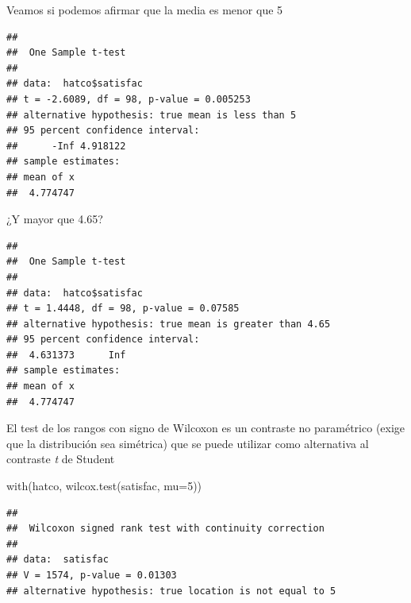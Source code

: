 \documentclass[
]{book}
\newenvironment{Shaded}{\begin{snugshade}}{\end{snugshade}}
\newcommand{\AttributeTok}[1]{\textcolor[rgb]{0.77,0.63,0.00}{#1}}
\newcommand{\DecValTok}[1]{\textcolor[rgb]{0.00,0.00,0.81}{#1}}
\newcommand{\FloatTok}[1]{\textcolor[rgb]{0.00,0.00,0.81}{#1}}
\newcommand{\FunctionTok}[1]{\textcolor[rgb]{0.00,0.00,0.00}{#1}}
\newcommand{\NormalTok}[1]{#1}
\newcommand{\SpecialCharTok}[1]{\textcolor[rgb]{0.00,0.00,0.00}{#1}}
\newcommand{\StringTok}[1]{\textcolor[rgb]{0.31,0.60,0.02}{#1}}
\theoremstyle{break}
\begin{document}
Veamos si podemos afirmar que la media es menor que 5

\begin{Shaded}
\end{Shaded}

\begin{verbatim}
## 
##  One Sample t-test
## 
## data:  hatco$satisfac
## t = -2.6089, df = 98, p-value = 0.005253
## alternative hypothesis: true mean is less than 5
## 95 percent confidence interval:
##      -Inf 4.918122
## sample estimates:
## mean of x 
##  4.774747
\end{verbatim}

¿Y mayor que 4.65?

\begin{Shaded}
\end{Shaded}

\begin{verbatim}
## 
##  One Sample t-test
## 
## data:  hatco$satisfac
## t = 1.4448, df = 98, p-value = 0.07585
## alternative hypothesis: true mean is greater than 4.65
## 95 percent confidence interval:
##  4.631373      Inf
## sample estimates:
## mean of x 
##  4.774747
\end{verbatim}

El test de los rangos con signo de Wilcoxon es un contraste no paramétrico
(exige que la distribución sea simétrica) que se puede utilizar como
alternativa al contraste \emph{t} de Student

\begin{Shaded}
\begin{Highlighting}[]
\FunctionTok{with}\NormalTok{(hatco, }\FunctionTok{wilcox.test}\NormalTok{(satisfac, }\AttributeTok{mu=}\DecValTok{5}\NormalTok{))}
\end{Highlighting}
\end{Shaded}

\begin{verbatim}
## 
##  Wilcoxon signed rank test with continuity correction
## 
## data:  satisfac
## V = 1574, p-value = 0.01303
## alternative hypothesis: true location is not equal to 5
\end{verbatim}
\end{document}
